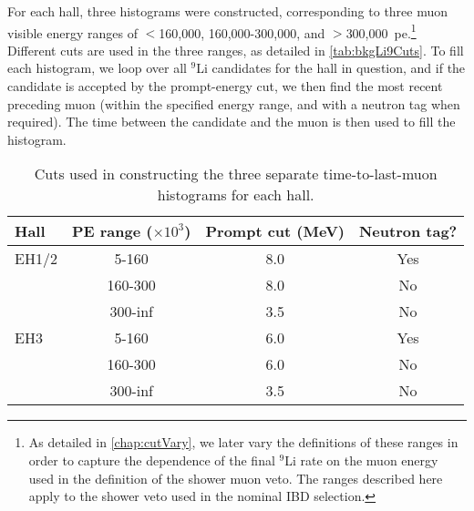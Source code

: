 \documentclass[../thesis.tex]{subfiles}
\begin{document}
For each hall, three histograms were constructed, corresponding to three muon visible energy ranges of $<$160,000, 160,000-300,000, and $>$300,000~pe.\footnote{As detailed in \autoref{chap:cutVary}, we later vary the definitions of these ranges in order to capture the dependence of the final $^9$Li rate on the muon energy used in the definition of the shower muon veto. The ranges described here apply to the shower veto used in the nominal IBD selection.} Different cuts are used in the three ranges, as detailed in \autoref{tab:bkgLi9Cuts}. To fill each histogram, we loop over all $^9$Li candidates for the hall in question, and if the candidate is accepted by the prompt-energy cut, we then find the most recent preceding muon (within the specified energy range, and with a neutron tag when required). The time between the candidate and the muon is then used to fill the histogram.

\begin{table}[h]
  \centering
  \begin{tabular}{lccc}
    \toprule
    Hall & PE range ($\times10^3$) & Prompt cut (MeV) & Neutron tag? \\
    \midrule
    EH1/2  & 5-160   & 8.0 & Yes \\
           & 160-300 & 8.0 & No  \\
           & 300-inf & 3.5 & No  \\
    \midrule
    EH3  & 5-160   & 6.0 & Yes \\
         & 160-300 & 6.0 & No  \\
         & 300-inf & 3.5 & No  \\
    \bottomrule
  \end{tabular}
  \caption{Cuts used in constructing the three separate time-to-last-muon histograms for each hall.}
  \label{tab:bkgLi9Cuts}
\end{table}
\end{document}
